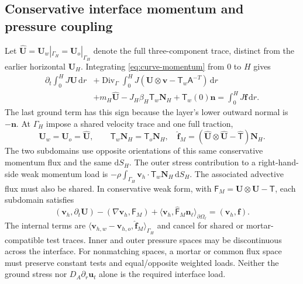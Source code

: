 \documentclass[11pt,a4paper]{article}
\numberwithin{equation}{section}
\newcommand{\dd}{\mathrm{d}}
\begin{document}
\subsection{Conservative interface momentum and pressure coupling}
Let $\widehat{\bm U}=\bm U_w|_{\Gamma_H}=\bm U_o|_{\Gamma_H}$
denote the full three-component trace, distinct from the earlier
horizontal $\bm U_H$. Integrating \cref{eq:curve-momentum} from
$0$ to $H$ gives
\begin{equation}
 \begin{aligned}
 \partial_t\int_0^H J\bm U\,\dd r
 &+\operatorname{Div}_\Gamma\int_0^H
   J(\bm U\otimes\bm v-\mathsf T_w \mathsf A^{-T})\,\dd r\\
 &+m_H\widehat{\bm U}-J_H\beta_H\mathsf T_w\bm N_H
   +\mathsf T_w(0)\bm n
 =\int_0^H J\bm f\,\dd r.
 \end{aligned}
 \label{eq:curve-integrated-momentum}
\end{equation}
The last ground term has this sign because the layer's lower outward
normal is $-\bm n$. At $\Gamma_H$ impose a shared velocity trace and
one full traction,
\begin{equation}
 \bm U_w=\bm U_o=\widehat{\bm U},\qquad
 \boxed{\mathsf T_w\bm N_H=\mathsf T_o\bm N_H,
 \quad \widehat{\bm f}_M
 = (\widehat{\bm U}\otimes\widehat{\bm U}-\widehat{\mathsf T})
   \bm N_H.}
 \label{eq:curve-momentum-interface}
\end{equation}
The two subdomains use opposite orientations of this same conservative
momentum flux and the same $\dd S_H$. The outer stress contribution
to a right-hand-side weak momentum load is
$-\rho\int_{\Gamma_H}\bm v_h\cdot\mathsf T_w\bm N_H\,\dd S_H$.
The associated advective flux must also be shared. In conservative
weak form, with $\mathsf F_M=\bm U\otimes\bm U-\mathsf T$, each
subdomain satisfies
\begin{equation}
 (\bm v_h,\partial_t\bm U)-(\nabla\bm v_h,\mathsf F_M)
 +\langle\bm v_h,\widehat{\mathsf F}_M\bm n_\ell\rangle_{\partial\Omega_\ell}
 =(\bm v_h,\bm f).
 \label{eq:curve-momentum-weak}
\end{equation}
The internal terms are
$\langle\bm v_{h,w}-\bm v_{h,o},\widehat{\bm f}_M\rangle_{\Gamma_H}$
and cancel for shared or mortar-compatible test traces. Inner and
outer pressure spaces may be discontinuous across the interface. For nonmatching
spaces, a mortar or common flux space must preserve constant tests
and equal/opposite weighted loads. Neither the ground stress nor
$D_A\partial_r\bm u_t$ alone is the required interface load.
\end{document}
